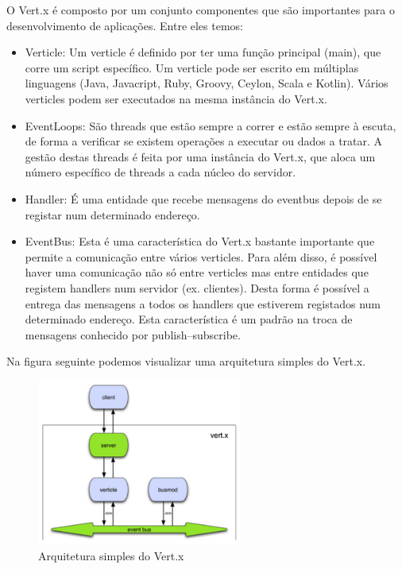 O Vert.x é composto por um conjunto componentes que são importantes para o desenvolvimento de aplicações. Entre eles temos: 

\begin{itemize}
  \item Verticle: Um verticle é definido por ter uma função principal (main), que corre um script específico. Um verticle pode ser escrito em múltiplas linguagens (Java, Javacript, Ruby, Groovy, Ceylon, Scala e Kotlin). Vários verticles podem ser executados na mesma instância do Vert.x.
  \item EventLoops: São threads que estão sempre a correr e estão sempre à escuta, de forma a verificar se existem operações a executar ou dados a tratar. A gestão destas threads é feita por uma instância do Vert.x, que aloca um número específico de threads a cada núcleo do servidor.
  \item Handler: É uma entidade que recebe mensagens do eventbus depois de se registar num determinado endereço.
  \item EventBus: Esta é uma característica do Vert.x bastante importante que permite a comunicação entre vários verticles. Para além disso, é possível haver uma comunicação não só entre verticles mas entre entidades que registem handlers num servidor (ex. clientes). Desta forma é possível a entrega das mensagens a todos os handlers que estiverem registados num determinado endereço. Esta característica é um padrão na troca de mensagens conhecido por publish–subscribe.
\end{itemize}

Na figura seguinte podemos visualizar uma arquitetura simples do Vert.x. \cite{vertx-study}

\begin{figure}[H]
  \centering
  \includegraphics[width=0.6\textwidth]{imgs/vertx_arch.png}
  \caption[Arquitetura simples do Vert.x]{Arquitetura simples do Vert.x}
  \label{f:vertxarch}
\end{figure}



